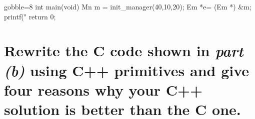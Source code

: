 \documentclass[NewMint]{supervision}
\begin{document}
\begin{questions}
\begin{parts}
\begin{cppcode*}{gobble=8}
        int main(void) {
            Mn m = init_manager(40,10,20);
            Em *e= (Em *) &m;
            printf("%
            return 0;
        }
        \end{cppcode*}

        \part[8]{Rewrite the C code shown in \emph{part (b)} using C++ primitives and give four reasons why your C++ solution is better than the C one.}

    \end{parts}


\end{questions}
\end{document}
